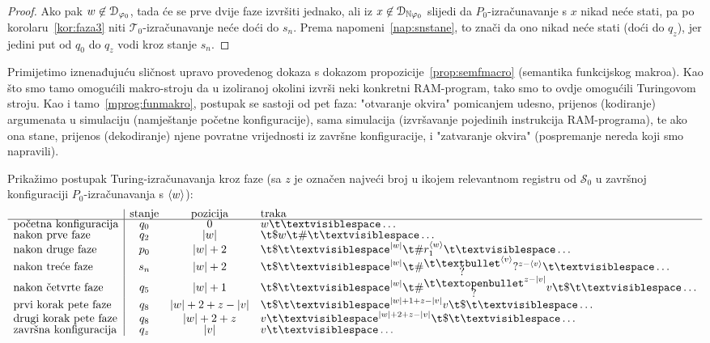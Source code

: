 \begin{proof}
Ako pak $w\not\in\mathcal D_{\varphi_0}$, tada će se prve dvije faze izvršiti jednako, ali iz $x\not\in\mathcal D_{{\mathbb N}\varphi_0}$ slijedi da $P_0$-izračunavanje s $x$ nikad neće stati, pa po korolaru~\ref{kor:faza3} niti $\mathcal T_0$-izračunavanje neće doći do $s_n$. Prema napomeni~\ref{nap:snstane}, to znači da ono nikad neće stati (doći do $q_z$), jer jedini put od $q_0$ do $q_z$ vodi kroz stanje $s_n$.
\end{proof}

Primijetimo iznenađujuću sličnost upravo provedenog dokaza s dokazom propozicije~\ref{prop:semfmacro} (semantika funkcijskog makroa). Kao što smo tamo omogućili makro-stroju da u izoliranoj okolini izvrši neki konkretni RAM-program, tako smo to ovdje omogućili Turingovom stroju. Kao i tamo~\eqref{mprog:funmakro}, postupak se sastoji od pet faza: "otvaranje okvira" pomicanjem udesno, prijenos (kodiranje) argumenata u simulaciju (namještanje početne konfiguracije), sama simulacija (izvršavanje pojedinih instrukcija RAM-programa), te ako ona stane, prijenos (dekodiranje) njene povratne vrijednosti iz završne konfiguracije, i "zatvaranje okvira" (pospremanje nereda koji smo napravili).

Prikažimo postupak Turing-iz\-ra\-ču\-na\-va\-nja kroz faze (sa $z$ je označen najveći broj u ikojem relevantnom registru od $\mathcal S_0$ u završnoj konfiguraciji $P_0$-izračunavanja s $\langle w\rangle$):
\begin{equation}
\begin{array}{l|ccl}
                             &\text{stanje}&\text{pozicija}&\text{traka}\\\hline
\text{početna konfiguracija} & q_0 & 0         & w\bl\ldots \\
\text{nakon prve faze}       & q_2 & \dulj w   & \t\$w\t\#\bl\ldots \\
\text{nakon druge faze}      & p_0 & \dulj w+2 & \t\$\bl^{\dulj w}\t\#r_1^{\kr w}\bl\ldots \\
\text{nakon treće faze}      & s_n & \dulj w+2 & \renewcommand{\arraystretch}{0.1}
    \t\$\bl^{\dulj w}\t\#\begin{array}{@{}c@{}}\t\textbullet\\?\end{array}^{\kr{v}}?^{z-\kr{v}}\bl\ldots\\
\text{nakon četvrte faze}    & q_5 & \dulj w+1 &
\renewcommand{\arraystretch}{0.1}
\t\$\bl^{\dulj w}\t\#\begin{array}{@{}c@{}}\t\textopenbullet\\?\end{array}^{z-\dulj v}v\t\$\bl\ldots\\
\text{prvi korak pete faze} & q_8 & \dulj w+2+z-\dulj v       & \t\$\bl^{\dulj w+1+z-\dulj v}v\t\$\bl\ldots\\
\text{drugi korak pete faze}& q_8 & \dulj w+2+z & v\bl^{\dulj w+2+z-\dulj v}\t\$\bl\ldots\\
\text{završna konfiguracija} & q_z & \dulj v   & v\bl\ldots
\end{array}
\end{equation}

